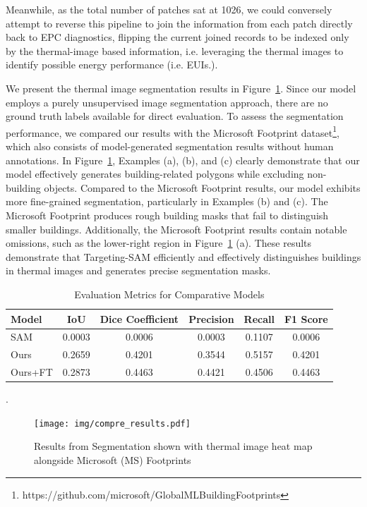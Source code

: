 \documentclass[preprint,12pt]{elsarticle}
\begin{document}
    Meanwhile, as the total number of patches sat at 1026, we could conversely attempt to reverse this pipeline to join the information from each patch directly back to EPC diagnostics, flipping the current joined records to be indexed only by the thermal-image based information, i.e. leveraging the thermal images to identify possible energy performance (i.e. EUIs.)\cite{abela_investigation_2016}.

    We present the thermal image segmentation results in Figure~\ref{fig:segresults}. Since our model employs a purely unsupervised image segmentation approach, there are no ground truth labels available for direct evaluation. To assess the segmentation performance, we compared our results with the Microsoft Footprint dataset\footnote{https://github.com/microsoft/GlobalMLBuildingFootprints}, which also consists of model-generated segmentation results without human annotations. In Figure~\ref{fig:segresults}, Examples (a), (b), and (c) clearly demonstrate that our model effectively generates building-related polygons while excluding non-building objects. Compared to the Microsoft Footprint results, our model exhibits more fine-grained segmentation, particularly in Examples (b) and (c). The Microsoft Footprint produces rough building masks that fail to distinguish smaller buildings. Additionally, the Microsoft Footprint results contain notable omissions, such as the lower-right region in Figure~\ref{fig:segresults} (a). These results demonstrate that Targeting-SAM efficiently and effectively distinguishes buildings in thermal images and generates precise segmentation masks.
    \begin{table}[htbp]
    \centering
    \caption{Evaluation Metrics for Comparative Models}
    \label{tab:evaluation_metrics}
    \begin{tabular}{lccccc}
        \toprule
        Model    & IoU   & Dice Coefficient & Precision & Recall & F1 Score \\
        \midrule
        SAM      &  0.0003 &  0.0006            & 0.0003     & 0.1107  & 0.0006   \\
        Ours     & 0.2659 & 0.4201            &  0.3544    &  0.5157  &  0.4201    \\
        Ours+FT  & 0.2873 & 0.4463             & 0.4421    & 0.4506   & 0.4463   \\
        \bottomrule
    \end{tabular}
\end{table}
.


    \begin{figure}[htbp]
    \centering
    \texttt{[image: img/compre\_results.pdf]}
    \caption{Results from Segmentation shown with thermal image heat map alongside Microsoft (MS) Footprints}
    \label{fig:segresults}
    \end{figure}
    
\end{document}
